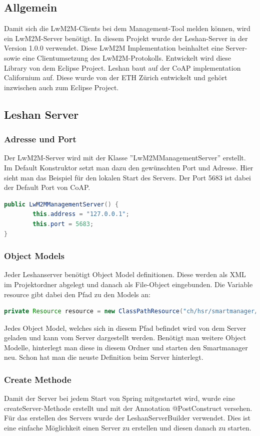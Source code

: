 \subsection{Allgemein}
Damit sich die LwM2M-Clients bei dem Management-Tool melden können, wird ein LwM2M-Server benötigt. In diesem Projekt wurde der Leshan-Server in der Version 1.0.0 verwendet. Diese LwM2M Implementation beinhaltet eine Server- sowie eine Clientumsetzung des LwM2M-Protokolls. Entwickelt wird diese Library von dem Eclipse Project. Leshan baut auf der CoAP implementation Californium auf. Diese wurde von der ETH Zürich entwickelt und  gehört inzwischen auch zum Eclipse Project.

\subsection{Leshan Server}
\subsubsection{Adresse und Port}
Der LwM2M-Server wird mit der Klasse ''LwM2MManagementServer'' erstellt. Im Default Konstruktor setzt man dazu den gewünschten Port und Adresse.
Hier sieht man das Beispiel für den lokalen Start des Servers. Der Port 5683 ist dabei der Default Port von CoAP.
\begin{lstlisting}[language=java]
public LwM2MManagementServer() {
		this.address = "127.0.0.1";
		this.port = 5683;
}
\end{lstlisting}
\subsubsection{Object Models}
Jeder Leshanserver benötigt Object Model definitionen. Diese werden als XML im Projektordner abgelegt und danach als File-Object eingebunden.
Die Variable resource gibt dabei den Pfad zu den Models an:
\begin{lstlisting}[language=java]
private Resource resource = new ClassPathResource("ch/hsr/smartmanager/resources/models/");
\end{lstlisting}
Jedes Object Model, welches sich in diesem Pfad befindet wird von dem Server geladen und kann vom Server dargestellt werden. Benötigt man weitere Object Modelle, hinterlegt man diese in diesem Ordner und starten den Smartmanager neu. Schon hat man die neuste Definition beim Server hinterlegt.
\subsubsection{Create Methode}
Damit der Server bei jedem Start von Spring mitgestartet wird, wurde eine createServer-Methode erstellt und mit der Annotation @PostConstruct versehen. Für das erstellen des Servers wurde der LeshanServerBuilder verwendet. Dies ist eine einfache Möglichkeit einen Server zu erstellen und diesen danach zu starten.

